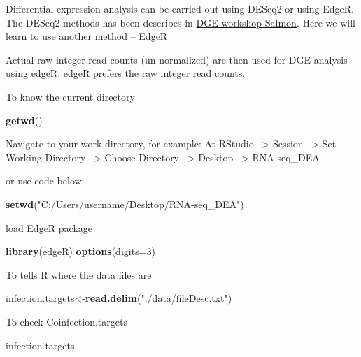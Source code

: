 \documentclass[
]{article}
\newenvironment{Shaded}{\begin{snugshade}}{\end{snugshade}}
\newcommand{\AttributeTok}[1]{\textcolor[rgb]{0.13,0.29,0.53}{#1}}
\newcommand{\DecValTok}[1]{\textcolor[rgb]{0.00,0.00,0.81}{#1}}
\newcommand{\FunctionTok}[1]{\textcolor[rgb]{0.13,0.29,0.53}{\textbf{#1}}}
\newcommand{\NormalTok}[1]{#1}
\newcommand{\OtherTok}[1]{\textcolor[rgb]{0.56,0.35,0.01}{#1}}
\newcommand{\StringTok}[1]{\textcolor[rgb]{0.31,0.60,0.02}{#1}}
\begin{document}
Differential expression analysis can be carried out using DESeq2 or
using EdgeR. The DESeq2 methods has been describes in
\href{https://github.com/hbctraining/DGE_workshop_salmon_online/blob/master/lessons/04a_design_formulas.md}{DGE
workshop Salmon}. Here we will learn to use another method -- EdgeR

Actual raw integer read counts (un-normalized) are then used for DGE
analysis using edgeR. edgeR prefers the raw integer read counts.

To know the current directory

\begin{Shaded}
\begin{Highlighting}[]
\FunctionTok{getwd}\NormalTok{()}
\end{Highlighting}
\end{Shaded}

Navigate to your work directory, for example: At RStudio
--\textgreater{} Session --\textgreater{} Set Working Directory
--\textgreater{} Choose Directory --\textgreater{} Desktop
--\textgreater{} RNA-seq\_DEA

or use code below:

\begin{Shaded}
\begin{Highlighting}[]
\FunctionTok{setwd}\NormalTok{(}\StringTok{"C:/Users/username/Desktop/RNA{-}seq\_DEA"}\NormalTok{)}
\end{Highlighting}
\end{Shaded}

load EdgeR package

\begin{Shaded}
\begin{Highlighting}[]
\FunctionTok{library}\NormalTok{(edgeR)}
\FunctionTok{options}\NormalTok{(}\AttributeTok{digits=}\DecValTok{3}\NormalTok{)}
\end{Highlighting}
\end{Shaded}

To tells R where the data files are

\begin{Shaded}
\begin{Highlighting}[]
\NormalTok{infection.targets}\OtherTok{\textless{}{-}}\FunctionTok{read.delim}\NormalTok{(}\StringTok{"./data/fileDesc.txt"}\NormalTok{)}
\end{Highlighting}
\end{Shaded}

To check Coinfection.targets

\begin{Shaded}
\begin{Highlighting}[]
\NormalTok{infection.targets}
\end{Highlighting}
\end{Shaded}
\end{document}

